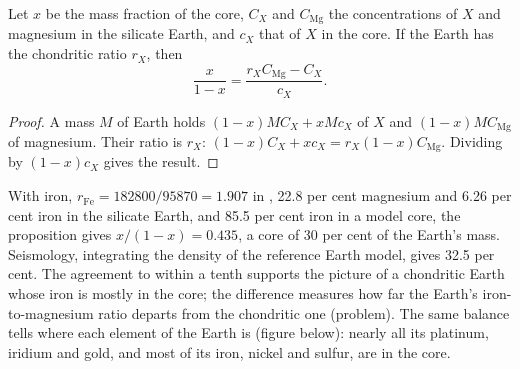 \begin{proposition}
\label{prop:b2:elements-in-the-earth:core}
Let $x$ be the mass fraction of the core, $C_X$ and $C_{\mathrm{Mg}}$ the
concentrations of $X$ and magnesium in the silicate Earth, and $c_X$ that of $X$ in
the core. If the Earth has the chondritic ratio $r_X$, then
\[
  \frac{x}{1-x} = \frac{r_X C_{\mathrm{Mg}} - C_X}{c_X}.
\]
\end{proposition}

\begin{proof}
A mass $M$ of Earth holds $(1-x)MC_X + xMc_X$ of $X$ and $(1-x)MC_{\mathrm{Mg}}$ of
magnesium. Their ratio is $r_X$:
$(1-x)C_X + xc_X = r_X(1-x)C_{\mathrm{Mg}}$. Dividing by $(1-x)c_X$ gives the
result.
\end{proof}

With iron, $r_{\mathrm{Fe}} = \num{182800}/\num{95870} = 1.907$ in ,
22.8 per cent magnesium and 6.26 per cent iron in the silicate Earth, and 85.5 per
cent iron in a model core, the proposition gives $x/(1-x) = 0.435$, a core of 30
per cent of the Earth's mass. Seismology, integrating the density of the
reference Earth model, gives 32.5 per cent. The agreement to within a tenth
supports the picture of a chondritic Earth whose iron is mostly in the core; the
difference measures how far the Earth's iron-to-magnesium ratio departs from the
chondritic one (problem). The same balance tells where each element of the Earth is
(figure below): nearly all its platinum, iridium and gold, and most of its iron,
nickel and sulfur, are in the core.

\begin{omfigure}
\centering
{}
\par{}
\end{omfigure}

